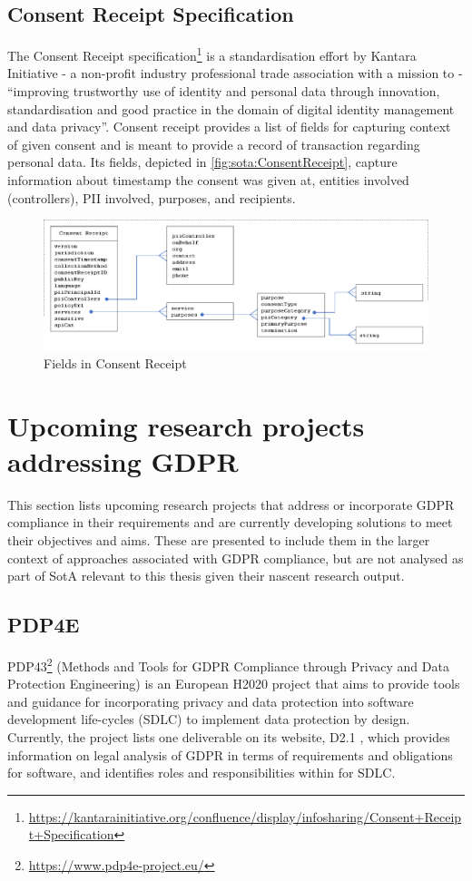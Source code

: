 \subsection*{Consent Receipt Specification}
The Consent Receipt specification\footnote{\url{https://kantarainitiative.org/confluence/display/infosharing/Consent+Receipt+Specification}} \cite{lizar_consent_2017} is a standardisation effort by Kantara Initiative - a non-profit industry professional trade association with a mission to - ``improving trustworthy use of identity and personal data through innovation, standardisation and good practice in the domain of digital identity management and data privacy''. Consent receipt provides a list of fields for capturing context of given consent and is meant to provide a record of transaction regarding personal data. Its fields, depicted in \autoref{fig:sota:ConsentReceipt}, capture information about timestamp the consent was given at, entities involved (controllers), PII involved, purposes, and recipients.
\begin{figure}[htbp]
    \centering
    \includegraphics[width=\linewidth]{img/ConsentReceipt.png}
    \caption{Fields in Consent Receipt \cite{lizar_consent_2017}}
    \label{fig:sota:ConsentReceipt}
\end{figure}

\section{Upcoming research projects addressing GDPR}
This section lists upcoming research projects that address or incorporate GDPR compliance in their requirements and are currently developing solutions to meet their objectives and aims. These are presented to include them in the larger context of approaches associated with GDPR compliance, but are not analysed as part of SotA relevant to this thesis given their nascent research output.

\subsection*{PDP4E}
PDP43\footnote{\url{https://www.pdp4e-project.eu/}} (Methods and Tools for GDPR Compliance through Privacy and Data Protection Engineering) is an European H2020 project that aims to provide tools and guidance for incorporating privacy and data protection into software development life-cycles (SDLC) to implement data protection by design. Currently, the project lists one deliverable on its website, D2.1 \cite{noauthor_d2.1_2019}, which provides information on legal analysis of GDPR in terms of requirements and obligations for software, and identifies roles and responsibilities within for SDLC.

